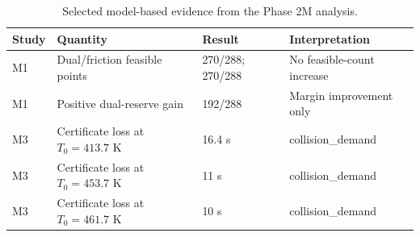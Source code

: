 \begin{table}[!t]
\centering\scriptsize
\caption{Selected model-based evidence from the Phase 2M analysis.}
\label{tab:final-model-evidence}
\begin{tabular}{llll}
\toprule
Study & Quantity & Result & Interpretation \\
\midrule
M1 & Dual/friction feasible points & 270/288; 270/288 & No feasible-count increase \\
M1 & Positive dual-reserve gain & 192/288 & Margin improvement only \\
M3 & Certificate loss at $T_0=413.7$ K & 16.4 s & collision\_demand \\
M3 & Certificate loss at $T_0=453.7$ K & 11 s & collision\_demand \\
M3 & Certificate loss at $T_0=461.7$ K & 10 s & collision\_demand \\
\bottomrule
\end{tabular}
\end{table}
